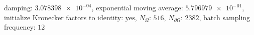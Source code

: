 damping: $\num[scientific-notation=true]{3.078398e-04}$, exponential moving average: $\num[scientific-notation=true]{5.796979e-01}$, initialize Kronecker factors to identity: $\text{yes}$, $N_{\Omega}$: $\num[scientific-notation=false]{516}$, $N_{\partial\Omega}$: $\num[scientific-notation=false]{2382}$, batch sampling frequency: $\num[scientific-notation=false]{12}$